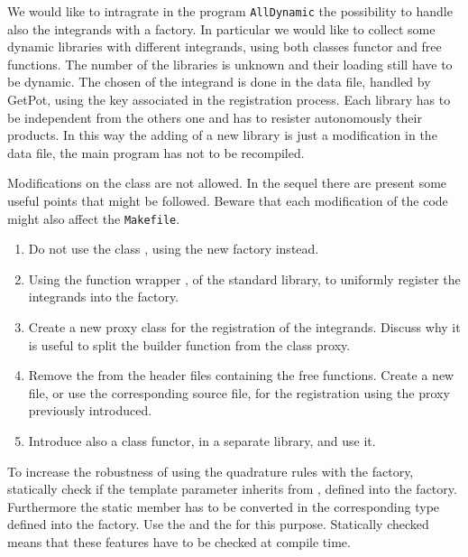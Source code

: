 
We would like to intragrate in the program \texttt{AllDynamic} the possibility
to handle also the integrands with a factory. In particular we would like to
collect some dynamic libraries with different integrands, using both classes
functor and free functions. The number of the libraries is unknown and their
loading still have to be dynamic. The chosen of the integrand is done in the
data file, handled by GetPot, using the key associated in the registration
process.  Each library has to be independent from the others one and has to
resister autonomously their products. In this way the adding of a new library is
just a modification in the data file, the main program has not to be recompiled.

Modifications on the class  are not allowed.
In the sequel there are present some useful points that might be followed.
Beware that each modification of the code might also affect the \texttt{Makefile}.

\begin{enumerate}

    \item Do not use the class , using the new factory
    instead.

    \item Using the function wrapper , of the standard
    library, to uniformly register the integrands into the factory.

    \item Create a new proxy class for the registration of the integrands.
    Discuss why it is useful to split the builder function from the class proxy.

    \item Remove the  from the header files containing the free
    functions. Create a new file, or use the corresponding source file,
    for the registration using the proxy previously introduced.

    \item Introduce also a class functor, in a separate library, and use it.

\end{enumerate}

To increase the robustness of using the quadrature rules with the factory,
statically check if the template parameter  inherits
from , defined into the factory. Furthermore the
static member  has to be converted in the corresponding type defined
into the factory. Use the  and the  for this
purpose. Statically checked means that these features have to be checked at
compile time.
